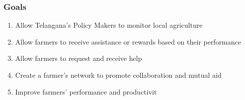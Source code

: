 \documentclass[10pt]{article}
\begin{document}
\subsubsection{Goals}
\begin{enumerate}[label=\textbf{G\arabic*}]
    \item \label{goal:g1} Allow Telangana's Policy Makers to monitor local agriculture
    \item \label{goal:g2} Allow farmers to receive assistance or rewards based on their performance
    \item \label{goal:g3} Allow farmers to request and receive help
    \item \label{goal:g4} Create a farmer's network to promote collaboration and mutual aid 
    \item \label{goal:g5} Improve farmers' performance and productivit
\end{enumerate}
\end{document}
